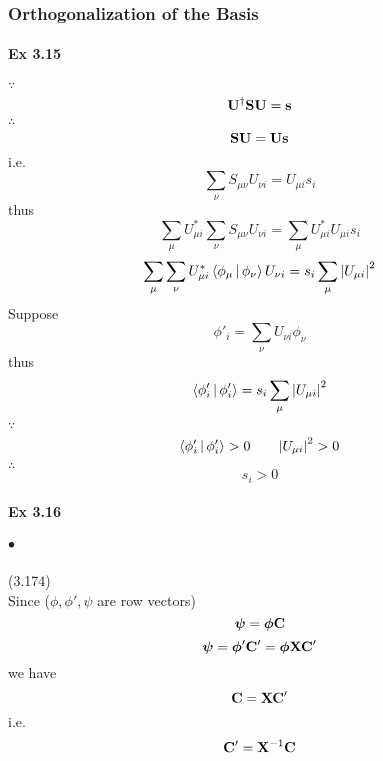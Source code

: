 \documentclass[a4paper]{article}
\newcommand{\ex}[1]{\paragraph{Ex #1}}
\newcommand{\subex}[1]{\subparagraph{#1}}
\numberwithin{equation}{subsection}
\begin{document}
\subsubsection{Orthogonalization of the Basis}
\ex{3.15}
$ \because $
\begin{equation}\label{key}
\vb{U}^\dagger \vb{S} \vb{U} = \vb{s}
\end{equation}
$ \therefore $
\begin{equation}\label{key}
\vb{S} \vb{U} = \vb{U} \vb{s}
\end{equation}
i.e.
\begin{equation}\label{key}
\sum_\nu S_{\mu\nu} U_{\nu i} = U_{\mu i} s_i
\end{equation}
thus
\begin{equation}\label{key}
\sum_\mu U_{\mu i}^* \sum_\nu S_{\mu\nu} U_{\nu i} = \sum_\mu U_{\mu i}^* U_{\mu i} s_i
\end{equation}
\begin{equation}\label{key}
\sum_\mu \sum_\nu U_{\mu i}^* \Braket{\phi_\mu| \phi_\nu} U_{\nu i} = s_i \sum_\mu \abs{ U_{\mu i}}^2 
\end{equation}
Suppose
\begin{equation}\label{key}
\phi'_i = \sum_\nu U_{\nu i}\phi_\nu
\end{equation}
thus
\begin{equation}\label{key}
\Braket{\phi'_i | \phi'_i} = s_i \sum_\mu \abs{ U_{\mu i}}^2 
\end{equation}
$ \because $
\begin{equation}\label{key}
\Braket{\phi'_i | \phi'_i} > 0 \qquad \abs{ U_{\mu i}}^2 > 0
\end{equation}
$ \therefore $
\begin{equation}\label{key}
s_i > 0
\end{equation}

\ex{3.16}
\subex{$ \bullet $} (3.174)\\
Since ($ \phi,\phi',\psi $ are row vectors)
\begin{equation}\label{key}
\bm\psi = \bm\phi \vb{C} 
\end{equation}
\begin{equation}\label{key}
\bm\psi = \bm\phi' \vb{C}' = \bm\phi \vb{X} \vb{C}'
\end{equation}
we have
\begin{equation}\label{key}
\vb{C} = \vb{X} \vb{C}'
\end{equation}
i.e.
\begin{equation}\label{key}
\vb{C}' = \vb{X}^{-1} \vb{C}
\end{equation}
\end{document}
